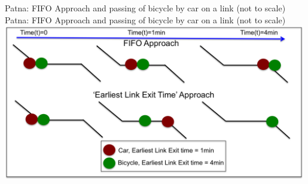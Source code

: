 \createfigure%
{Patna: FIFO Approach and passing of bicycle by car on a link (not to scale)}%
{Patna: FIFO Approach and passing of bicycle by car on a link (not to scale)}%
{\label{fig:patna1}}%
{\includegraphics[width=0.99\textwidth, angle=0]{using/figures/FIFOandPassing}}%
{}

